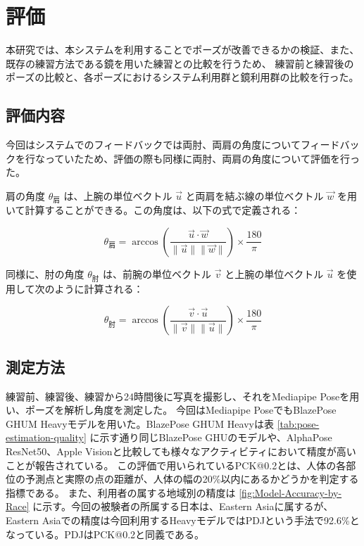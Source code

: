\chapter{評価}
\label{evaluation}
本研究では、本システムを利用することでポーズが改善できるかの検証、また、既存の練習方法である鏡を用いた練習との比較を行うため、
練習前と練習後のポーズの比較と、各ポーズにおけるシステム利用群と鏡利用群の比較を行った。
\section{評価内容}
今回はシステムでのフィードバックでは両肘、両肩の角度についてフィードバックを行なっていたため、評価の際も同様に両肘、両肩の角度について評価を行った。


肩の角度 \(\theta_{\text{肩}}\) は、上腕の単位ベクトル \(\vec{u}\) と両肩を結ぶ線の単位ベクトル \(\vec{w}\) を用いて計算することができる。この角度は、以下の式で定義される：

\[
\theta_{\text{肩}} = \arccos\left( \frac{\vec{u} \cdot \vec{w}}{\|\vec{u}\| \|\vec{w}\|} \right) \times \frac{180}{\pi}
\]


同様に、肘の角度 \(\theta_{\text{肘}}\) は、前腕の単位ベクトル \(\vec{v}\) と上腕の単位ベクトル \(\vec{u}\) を使用して次のように計算される：

\[
\theta_{\text{肘}} = \arccos\left( \frac{\vec{v} \cdot \vec{u}}{\|\vec{v}\| \|\vec{u}\|} \right) \times \frac{180}{\pi}
\]

\section{測定方法}
練習前、練習後、練習から24時間後に写真を撮影し、それをMediapipe Poseを用い、ポーズを解析し角度を測定した。
今回はMediapipe PoseでもBlazePose GHUM Heavyモデルを用いた。BlazePose GHUM Heavyは表 \ref{tab:pose-estimation-quality} に示す通り同じBlazePose GHUのモデルや、AlphaPose ResNet50、Apple Visionと比較しても様々なアクティビティにおいて精度が高いことが報告されている。
この評価で用いられているPCK@0.2とは、人体の各部位の予測点と実際の点の距離が、人体の幅の20\%以内にあるかどうかを判定する指標である。\cite{PCK} また、利用者の属する地域別の精度は \ref{fig:Model-Accuracy-by-Race} に示す。今回の被験者の所属する日本は、Eastern Asiaに属するが、Eastern Asiaでの精度は今回利用するHeavyモデルではPDJという手法で92.6\%となっている。PDJはPCK@0.2と同義である。

